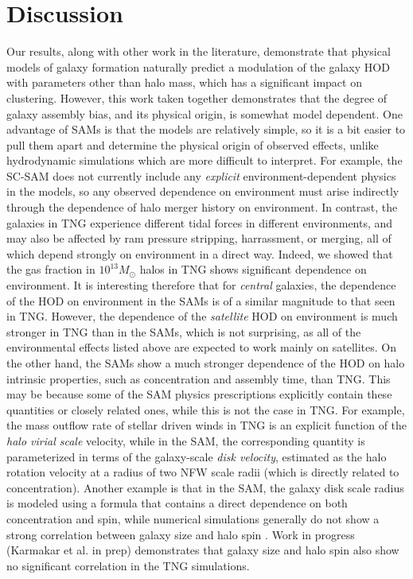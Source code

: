 \documentclass[fleqn,usenatbib]{mnras}
\begin{document}
\section{Discussion}
\label{sec:discussion}
Our results, along with other work in the literature, demonstrate that physical models of galaxy formation naturally predict a modulation of the galaxy HOD with parameters other than halo mass, which has a significant impact on clustering. However, this work taken together demonstrates that the degree of galaxy assembly bias, and its physical origin, is somewhat model dependent. One advantage of SAMs is that the models are relatively simple, so it is a bit easier to pull them apart and determine the physical origin of observed effects, unlike hydrodynamic simulations which are more difficult to interpret. For example, the SC-SAM does not currently include any \emph{explicit} environment-dependent physics in the models, so any observed dependence on environment must arise indirectly through the dependence of halo merger history on environment. In contrast, the galaxies in TNG experience different tidal forces in different environments, and may also be affected by ram pressure stripping, harrassment, or merging, all of which depend strongly on environment in a direct way. Indeed, we showed that the gas fraction in $10^{13} M_\odot$ halos in TNG shows significant dependence on environment. It is interesting therefore that for \emph{central} galaxies, the dependence of the HOD on environment in the SAMs is of a similar magnitude to that seen in TNG. However, the dependence of the \emph{satellite} HOD on environment is much stronger in TNG than in the SAMs, which is not surprising, as all of the environmental effects listed above are expected to work mainly on satellites. On the other hand, the SAMs show a much stronger dependence of the HOD on halo intrinsic properties, such as concentration and assembly time, than TNG. This may be because some of the SAM physics prescriptions explicitly contain these quantities or closely related ones, while this is not the case in TNG. For example, the mass outflow rate of stellar driven winds in TNG is an explicit function of the \emph{halo virial scale} velocity, while in the SAM, the corresponding quantity is parameterized in terms of the galaxy-scale \emph{disk velocity}, estimated as the halo rotation velocity at a radius of two NFW scale radii (which is directly related to concentration). Another example is that in the SAM, the galaxy disk scale radius is modeled using a formula that contains a direct dependence on both concentration and spin, while numerical simulations generally do not show a strong correlation between galaxy size and halo spin \citep[e.g.][]{2019MNRAS.488.4801J}. Work in progress (Karmakar et al. in prep) demonstrates that galaxy size and halo spin also show no significant correlation in the TNG simulations. 
\end{document}
